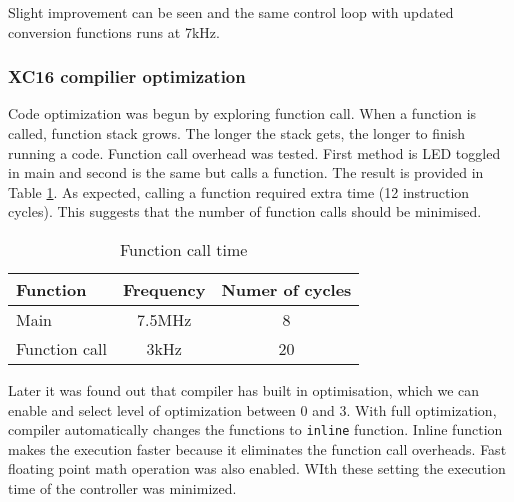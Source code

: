 Slight improvement can be seen and the same control loop with updated conversion functions runs at 7kHz.


\subsubsection{XC16 compilier optimization}
Code optimization was begun by exploring function call. When a function is called, function stack grows. The longer the stack gets, the longer to finish running a code. Function call overhead was tested. First method is LED toggled in main and second is the same but calls a function. The result is provided in Table \ref{tab:stack}. As expected, calling a function required extra time (12 instruction cycles). This suggests that the number of function calls should be minimised. 

\begin{table}[h]
\centering
\begin{tabular}{|p{4cm} | c | c|}
\hline
Function        & Frequency & Numer of cycles\\ \hline \hline
Main            & 7.5MHz    & 8\\ \hline
Function call   & 3kHz      & 20\\ \hline
\end{tabular}
\caption{Function call time}
\label{tab:stack}
\end{table}

Later it was found out that compiler has built in optimisation, which we can enable and select level of optimization between 0 and 3. With full optimization, compiler automatically changes the functions to \texttt{inline} function. Inline function makes the execution faster because it eliminates the function call overheads. Fast floating point math operation was also enabled. WIth these setting the execution time of the controller was minimized. 